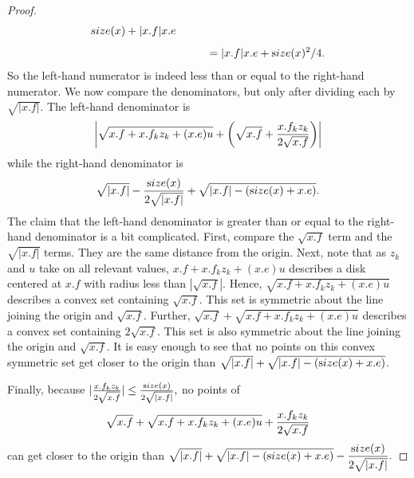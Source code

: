 \begin{proof}{}
\begin{eqnarray*}
{size}(x) + |x.f| x.e\\[4pt]
&&\qquad = |x.f| x.e + {\textrm size}(x)^2/4.
\end{eqnarray*}
So the left-hand numerator is indeed less than or equal to the right-hand numerator.
We now compare the denominators, but only after dividing each by
$\sqrt {|x.f|}$. 
The left-hand denominator is
$$\left|\sqrt {x.f + x.f_k z_k + (x.e) u} + 
\left(\sqrt {x.f} + {x.f_k z_k\over 2 \sqrt{x.f}}\right)\right|$$
while the right-hand denominator is 
$$\sqrt{|x.f|} - {{\textrm size}(x) \over 2 \sqrt {|x.f|}} + \sqrt {|x.f| - ({\textrm size}(x) + x.e)}.$$
The claim that the left-hand denominator is greater than or equal to the right-hand denominator is a bit complicated.  First, compare the $\sqrt{x.f}$ term and the $\sqrt{|x.f|}$ terms.  They are the same distance from the origin.  Next, note that as $z_k$ and $u$ take on all
relevant values, $x.f + x.f_k z_k + (x.e) u$ describes a disk centered at $x.f$
with radius   less than $ |\sqrt {x.f}|$.  Hence, $\sqrt {x.f + x.f_k z_k + (x.e) u}$ describes a convex set containing $\sqrt{x.f}$.  This set
is symmetric about the line joining the origin and $\sqrt{x.f}$. Further, $\sqrt{x.f} + \sqrt {x.f + x.f_k z_k + (x.e) u}$ describes a convex
set containing $2 \sqrt{x.f}$.   This set is also symmetric about the line joining the origin and  $\sqrt{x.f}$.
It is easy enough to see that no points on this convex symmetric set get closer to the origin than $\sqrt{|x.f|}  + \sqrt {|x.f| - ({\textrm size}(x) + x.e)}$.

Finally, because $|{x.f_k z_k \over 2 \sqrt{x.f}}| \le {{\textrm size}(x) \over 2 \sqrt {|x.f|}},$ no points of $$\sqrt {x.f} + \sqrt {x.f + x.f_k z_k + (x.e) u} + 
{x.f_k z_k \over 2 \sqrt{x.f}}$$
can get closer to the origin than
\hfill ${\displaystyle \sqrt{|x.f|} + \sqrt {|x.f| - ({\textrm size}(x) + x.e)} - 
{{\textrm size}(x) \over 2 \sqrt {|x.f|}}.} $ \end{proof}

